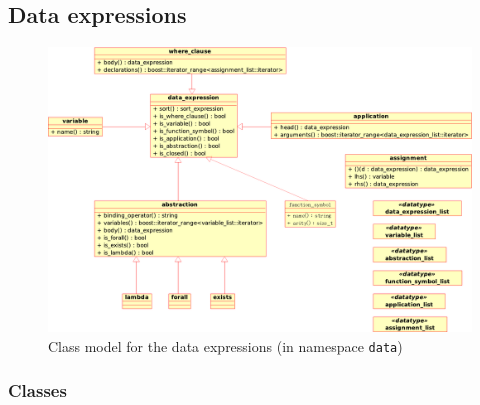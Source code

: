 \documentclass[a4paper,11pt]{article}
\newcommand{\comment}[1]{\begin{quotation} {\sf *** #1 ***} \end{quotation}}
\begin{document}
\subsection{Data expressions}
% 

\begin{figure}[htp]
    \begin{center}
      \includegraphics[width=\textwidth]{data_expr}
      \caption{Class model for the data expressions (in namespace \texttt{data})}
      \label{fig:class_data expressions}
    \end{center}
  \end{figure}

\subsubsection{Classes}
\end{document}
